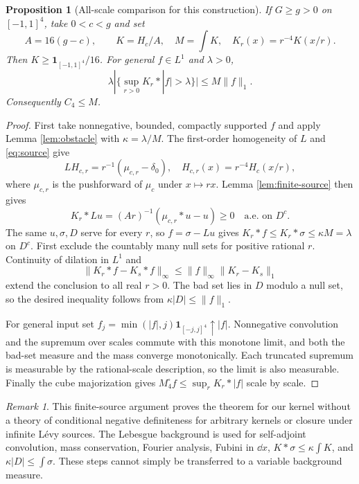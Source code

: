 \documentclass[11pt,a4paper]{article}
\newtheorem{proposition}[theorem]{Proposition}
\theoremstyle{remark}\newtheorem{remark}[theorem]{Remark}
\newcommand{\1}{\mathbf1}\newcommand{\pos}[1]{(#1)_+}
\begin{document}
\begin{proposition}[All-scale comparison for this construction]\label{prop:transfer}
If $G\ge g>0$ on $[-1,1]^4$, take $0<c<g$ and set
\[
 A=16(g-c),\qquad K=H_c/A,\quad M=\int K,\quad K_r(x)=r^{-4}K(x/r).
\]
Then $K\ge\1_{[-1,1]^4}/16$. For general $f\in L^1$ and $\lambda>0$,
\[
 \lambda|\{\sup_{r>0}K_r*|f|>\lambda\}|\le M\|f\|_1.
\]
Consequently $C_4\le M$.
\end{proposition}
\begin{proof}
First take nonnegative, bounded, compactly supported $f$ and apply Lemma \ref{lem:obstacle} with $\kappa=\lambda/M$. The first-order homogeneity of $L$ and \eqref{eq:source} give
\[
 LH_{c,r}=r^{-1}(\mu_{c,r}-\delta_0),
 \quad H_{c,r}(x)=r^{-4}H_c(x/r),
\]
where $\mu_{c,r}$ is the pushforward of $\mu_c$ under $x\mapsto rx$. Lemma \ref{lem:finite-source} then gives
\[
 K_r*Lu=(Ar)^{-1}(\mu_{c,r}*u-u)\ge0\quad\text{a.e. on }D^c.
\]
The same $u,\sigma,D$ serve for every $r$, so $f=\sigma-Lu$ gives
$K_r*f\le K_r*\sigma\le\kappa M=\lambda$ on $D^c$.
First exclude the countably many null sets for positive rational $r$. Continuity of dilation in $L^1$ and
\[
 \|K_r*f-K_s*f\|_\infty\le\|f\|_\infty\|K_r-K_s\|_1
\]
extend the conclusion to all real $r>0$. The bad set lies in $D$ modulo a null set, so the desired inequality follows from $\kappa|D|\le\|f\|_1$.

For general input set $f_j=\min(|f|,j)\1_{[-j,j]^4}\uparrow|f|$. Nonnegative convolution and the supremum over scales commute with this monotone limit, and both the bad-set measure and the mass converge monotonically. Each truncated supremum is measurable by the rational-scale description, so the limit is also measurable. Finally the cube majorization gives $M_4^\square f\le\sup_rK_r*|f|$ scale by scale.
\end{proof}
\begin{remark}
This finite-source argument proves the theorem for our kernel without a theory of conditional negative definiteness for arbitrary kernels or closure under infinite L\'evy sources. The Lebesgue background is used for self-adjoint convolution, mass conservation, Fourier analysis, Fubini in $\dd x$, $K*\sigma\le\kappa\int K$, and $\kappa|D|\le\int\sigma$. These steps cannot simply be transferred to a variable background measure.
\end{remark}
\end{document}
